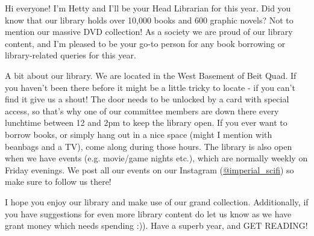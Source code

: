 Hi everyone! I'm Hetty and I'll be your Head Librarian for this year. Did you know that our library holds over 10,000 books and 600 graphic novels? Not to mention our massive DVD collection! As a society we are proud of our library content, and I'm pleased to be your go-to person for any book borrowing or library-related queries for this year.

A bit about our library. We are located in the West Basement of Beit Quad. If you haven't been there before it might be a little tricky to locate - if you can't find it give us a shout! The door needs to be unlocked by a card with special access, so that's why one of our committee members are down there every lunchtime between 12 and 2pm to keep the library open. If you ever want to borrow books, or simply hang out in a nice space (might I mention with beanbags and a TV), come along during those hours. The library is also open when we have events (e.g. movie/game nights etc.), which are normally weekly on Friday evenings. We post all our events on our Instagram (\href{https://www.instagram.com/imperial_scifi/?hl=en}{@imperial\_scifi}) so make sure to follow us there!

I hope you enjoy our library and make use of our grand collection. Additionally, if you have suggestions for even more library content do let us know as we have grant money which needs spending :)). Have a superb year, and GET READING!
